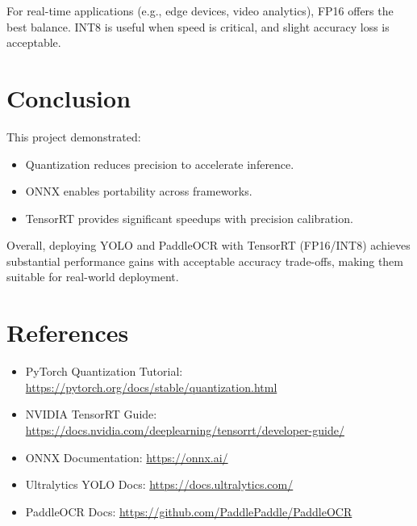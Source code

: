 \documentclass[12pt,a4paper]{article}
\begin{document}
For real-time applications (e.g., edge devices, video analytics), FP16 offers the best balance. INT8 is useful when speed is critical, and slight accuracy loss is acceptable.

\section{Conclusion}
This project demonstrated:
\begin{itemize}
    \item Quantization reduces precision to accelerate inference.  
    \item ONNX enables portability across frameworks.  
    \item TensorRT provides significant speedups with precision calibration.  
\end{itemize}

Overall, deploying YOLO and PaddleOCR with TensorRT (FP16/INT8) achieves substantial performance gains with acceptable accuracy trade-offs, making them suitable for real-world deployment.

\section{References}
\begin{itemize}
    \item PyTorch Quantization Tutorial: \url{https://pytorch.org/docs/stable/quantization.html}
    \item NVIDIA TensorRT Guide: \url{https://docs.nvidia.com/deeplearning/tensorrt/developer-guide/}
    \item ONNX Documentation: \url{https://onnx.ai/}
    \item Ultralytics YOLO Docs: \url{https://docs.ultralytics.com/}
    \item PaddleOCR Docs: \url{https://github.com/PaddlePaddle/PaddleOCR}
\end{itemize}
\end{document}
